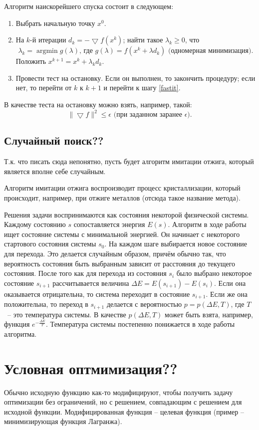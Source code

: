 \documentclass[10pt]{article}
\newcommand{\argmin}{\mathop{\mathrm{argmin}}\nolimits}
\begin{document}
		Алгоритм наискорейшего спуска состоит в следующем:
		\begin{enumerate}
			\item Выбрать начальную точку $x^0$.
			\item \label{fastit} На $k$-й итерации $d_k = -\bigtriangledown f(x^k)$; найти такое $\lambda_k \ge 0$, что
			  	  $$\lambda_k = \argmin g(\lambda) \mbox{, где } g(\lambda) = f(x^k + \lambda d_k) \mbox{ (одномерная минимизация)}.$$
			  	  Положить $x^{k+1} = x^k + \lambda_k d_k.$
			\item Провести тест на остановку. Если он выполнен, то закончить процедуру;
			  	  если нет, то перейти от $k$ к $k+1$ и перейти к шагу \ref{fastit}.
		\end{enumerate}

		В качестве теста на остановку можно взять, например, такой:
		$$\|\bigtriangledown f\|^2 \le \epsilon \mbox{ (при заданном заранее }\epsilon\mbox{)}.$$

	\subsection{Случайный поиск??}
			Т.к. что писать сюда непонятно, пусть будет алгоритм имитации отжига, который является вполне себе случайным.
			
			Алгоритм имитации отжига воспроизводит процесс кристаллизации, который происходит,
			например, при отжиге металлов (отсюда такое название метода).
			
			Решения задачи воспринимаются как состояния
			некоторой физической системы. Каждому состоянию $s$ сопоставляется энергия $E(s)$. Алгоритм в ходе работы
			ищет состояние системы с минимальной энергией. Он начинает с некоторого стартового состояния системы $s_0$.
			На каждом шаге выбирается новое состояние для перехода. Это делается случайным образом, причём обычно так,
			что вероятность состояния быть выбранным зависит от расстояния до текущего состояния. После того как для перехода из
			состояния $s_i$ было выбрано некоторое состояние $s_{i+1}$ рассчитывается величина $\Delta E = E(s_{i+1}) - E(s_i)$.
			Если она оказывается отрицательна, то система переходит в состояние $s_{i+1}$. Если же она положительна,
			то переход в $s_{i+1}$ делается с вероятностью $p = p(\Delta E, T)$, где $T$~-- это температура системы.
			В качестве $p(\Delta E, T)$ может быть взята, например, функция $e^{- \frac{\Delta E}{T}}$. 
			Температура системы постепенно понижается в ходе работы алгоритма.	

\section{Условная оптмимизация??}
	Обычно исходную функцию как-то модифицируют, чтобы получить задачу оптимизации без ограничений, но с решением,
	совпадающим с решением для исходной функции. Модифицированная функция – целевая функция (пример – минимизирующая функция Лагранжа).
	
\end{document}
